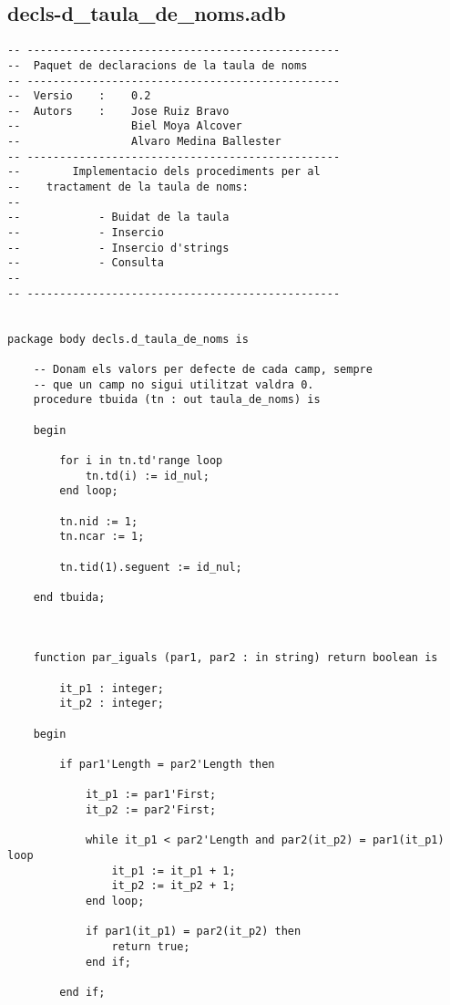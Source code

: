\documentclass[10pt]{report}
\begin{document}
    \newpage
    \subsection{decls-d\_taula\_de\_noms.adb}
    \begin{lstlisting}[style=Ada]
-- ------------------------------------------------
--  Paquet de declaracions de la taula de noms
-- ------------------------------------------------
--  Versio    :    0.2
--  Autors    :    Jose Ruiz Bravo
--                 Biel Moya Alcover
--                 Alvaro Medina Ballester
-- ------------------------------------------------
--        Implementacio dels procediments per al
--    tractament de la taula de noms:
--
--            - Buidat de la taula
--            - Insercio
--            - Insercio d'strings
--            - Consulta
--
-- ------------------------------------------------


package body decls.d_taula_de_noms is

    -- Donam els valors per defecte de cada camp, sempre 
    -- que un camp no sigui utilitzat valdra 0.
    procedure tbuida (tn : out taula_de_noms) is
    
    begin 
    
        for i in tn.td'range loop
            tn.td(i) := id_nul;
        end loop;
        
        tn.nid := 1;
        tn.ncar := 1;
        
        tn.tid(1).seguent := id_nul;
        
    end tbuida;
    
    
    
    function par_iguals (par1, par2 : in string) return boolean is
    
        it_p1 : integer;
        it_p2 : integer;
        
    begin
            
        if par1'Length = par2'Length then
            
            it_p1 := par1'First;
            it_p2 := par2'First;
                        
            while it_p1 < par2'Length and par2(it_p2) = par1(it_p1) loop
                it_p1 := it_p1 + 1;
                it_p2 := it_p2 + 1;
            end loop;
    
            if par1(it_p1) = par2(it_p2) then
                return true;
            end if;
            
        end if;
        

\end{lstlisting}
\end{document}
